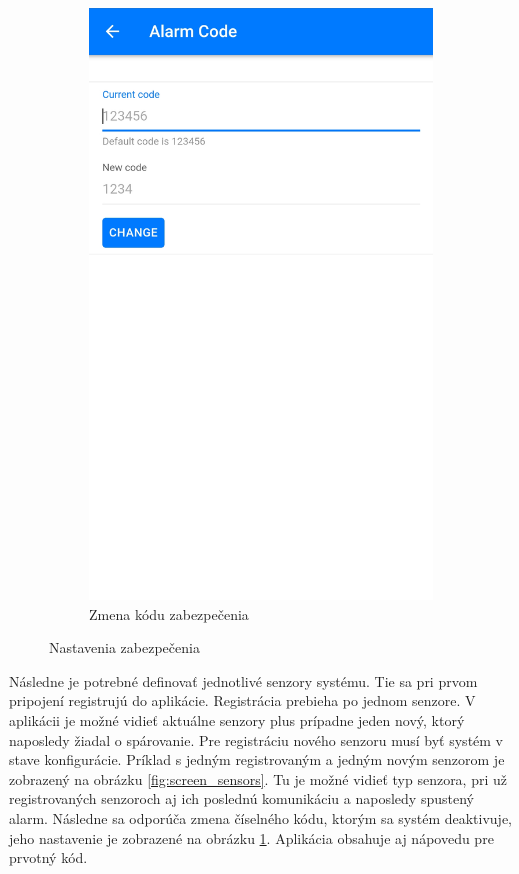 \begin{figure}[!ht]
\begin{subfigure}{.4\textwidth}
      \includegraphics[width=.8\linewidth]{obrazky-figures/screen_code.jpg}  
      \caption{Zmena kódu zabezpečenia}
      \label{fig:screen_code}
    \end{subfigure}
    \caption{Nastavenia zabezpečenia}
    \label{fig:nastavenie_zabezpecenia}
\end{figure}

Následne je potrebné definovať jednotlivé senzory systému. Tie sa pri prvom pripojení registrujú do aplikácie. Registrácia prebieha po jednom senzore. V aplikácii je možné vidieť aktuálne senzory plus prípadne jeden nový, ktorý naposledy žiadal o spárovanie. Pre registráciu nového senzoru musí byť systém v stave konfigurácie. Príklad s jedným registrovaným a jedným novým senzorom je zobrazený na obrázku \ref{fig:screen_sensors}. Tu je možné vidieť typ senzora, pri už registrovaných senzoroch aj ich poslednú komunikáciu a naposledy spustený alarm. Následne sa odporúča zmena číselného kódu, ktorým sa systém deaktivuje, jeho nastavenie je zobrazené na obrázku \ref{fig:screen_code}. Aplikácia obsahuje aj nápovedu pre prvotný kód.

